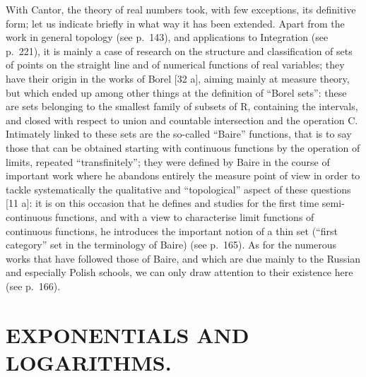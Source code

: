 With Cantor, the theory of real numbers took, with few exceptions, its definitive form; let us indicate briefly in what way it has been extended. Apart from the work in general topology (see p.~143), and applications to Integration (see p.~221), it is mainly a case of research on the structure and classification of sets of points on the straight line and of numerical functions of real variables; they have their origin in the works of Borel {[}32 a{]}, aiming mainly at measure theory, but which ended up among other things at the definition of ``Borel sets'': these are sets belonging to the smallest family of subsets of R, containing the intervals, and closed with respect to union and countable intersection and the operation C. Intimately linked to these sets are the so-called ``Baire'' functions, that is to say those that can be obtained starting with continuous functions by the operation of limits, repeated ``transfinitely''; they were defined by Baire in the course of important work where he abandons entirely the measure point of view in order to tackle systematically the qualitative and ``topological'' aspect of these questions {[}11 a{]}: it is on this occasion that he defines and studies for the first time semi-continuous functions, and with a view to characterise limit functions of continuous functions, he introduces the important notion of a thin set (``first category'' set in the terminology of Baire) (see p.~165). As for the numerous works that have followed those of Baire, and which are due mainly to the Russian and especially Polish schools, we can only draw attention to their existence here (see p.~166).

\chapter{EXPONENTIALS AND LOGARITHMS.}

